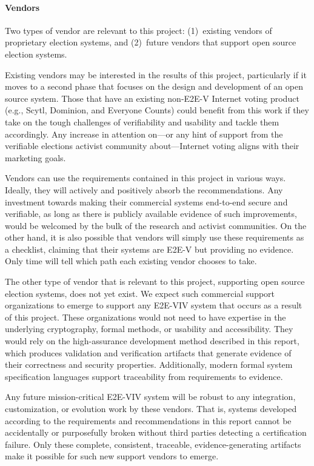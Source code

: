 \paragraph{Vendors}
Two types of vendor are relevant to this project: (1)~existing vendors
of proprietary election systems, and (2)~future vendors that support
open source election systems.

Existing vendors may be interested in the results of this project,
particularly if it moves to a second phase that focuses on the design
and development of an open source system. Those that have an existing
non-E2E-V Internet voting product (e.g., Scytl, Dominion, and Everyone
Counts) could benefit from this work if they take on the tough
challenges of verifiability and usability and tackle them
accordingly. Any increase in attention on—or any hint of support from
the verifiable elections activist community about—Internet voting
aligns with their marketing goals.

Vendors can use the requirements contained in this project in various
ways. Ideally, they will actively and positively absorb the
recommendations. Any investment towards making their commercial
systems end-to-end secure and verifiable, as long as there is publicly
available evidence of such improvements, would be welcomed by the bulk
of the research and activist communities. On the other hand, it is
also possible that vendors will simply use these requirements as a
checklist, claiming that their systems are E2E-V but providing no
evidence. Only time will tell which path each existing vendor chooses
to take.
 
The other type of vendor that is relevant to this project, supporting
open source election systems, does not yet exist. We expect such
commercial support organizations to emerge to support any E2E-VIV
system that occurs as a result of this project. These organizations
would not need to have expertise in the underlying cryptography,
formal methods, or usability and accessibility. They would rely on the
high-assurance development method described in this report, which
produces validation and verification artifacts that generate evidence
of their correctness and security properties. Additionally, modern
formal system specification languages support traceability from
requirements to evidence.

Any future mission-critical E2E-VIV system will be robust to any
integration, customization, or evolution work by these vendors. That
is, systems developed according to the requirements and
recommendations in this report cannot be accidentally or purposefully
broken without third parties detecting a certification failure. Only
these complete, consistent, traceable, evidence-generating artifacts
make it possible for such new support vendors to emerge.

